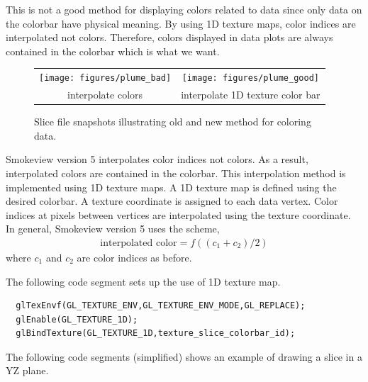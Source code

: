 \documentclass[11pt,twoside]{book}
\newcommand{\figoptions}{P}
\begin{document}
This is not a good method for displaying colors related to data since only data on the colorbar have physical meaning.  By using 1D texture maps, color indices are interpolated not colors.  Therefore, colors displayed in data plots are always contained in the colorbar which is what we want.



\begin{figure}[\figoptions]
\begin{center}
\begin{tabular}{cc}
\texttt{[image: figures/plume\_bad]}&\texttt{[image: figures/plume\_good]}\\
interpolate colors&interpolate 1D texture color bar\\
\end{tabular}
\caption [Slice file snapshots illustrating old and new method for
coloring data.] {Slice file snapshots illustrating old and new
method for coloring data.}
\label{fignewslice}%
\end{center}
\end{figure}


Smokeview version 5 interpolates color indices not colors.
As a result, interpolated colors are contained in the colorbar.  This interpolation method is implemented using 1D texture maps.  A 1D texture map is defined using the desired colorbar.  A texture coordinate is assigned to each data vertex.    Color indices at pixels between vertices are interpolated using the texture coordinate.  In general, Smokeview version 5 uses the scheme,
\begin{eqnarray*}
\mbox{interpolated color}=f((c_1+c_2)/2)
\end{eqnarray*}
where $c_1$ and $c_2$ are color indices as before.

The following code segment sets up the use of 1D texture map.

\begin{verbatim}
  glTexEnvf(GL_TEXTURE_ENV,GL_TEXTURE_ENV_MODE,GL_REPLACE);
  glEnable(GL_TEXTURE_1D);
  glBindTexture(GL_TEXTURE_1D,texture_slice_colorbar_id);
\end{verbatim}

The following code segments (simplified) shows an example of drawing a slice in a YZ plane.
\end{document}
